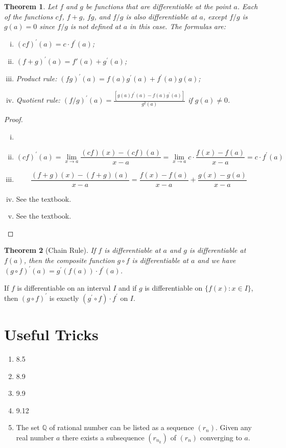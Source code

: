 \documentclass[12pt, lettersize]{book}
\newtheorem{thm}{Theorem}[section]
\begin{document}
	\begin{thm}\label{def:28.3}
		Let $f$ and $g$ be functions that are differentiable at the point $a$. Each of the functions $cf$, $f+g$, $fg$, and $f/g$ is also differentiable at $a$, except $f/g$ is $g(a)=0$ since $f/g$ is not defined at $a$ in this case.
		The formulas are:
		\begin{enumerate}[(i)]
			\item $(cf)^\prime(a)=c\cdot f^\prime(a)$;
			\item $(f+g)^\prime(a)=f\prime(a)+g^\prime(a)$;
			\item Product rule: $(fg)^\prime(a)=f(a)g^\prime(a)+f^\prime(a)g(a)$;
			\item Quotient rule: $(f/g)^\prime(a)=\frac{[g(a)f^\prime(a)-f(a)g^\prime(a)]}{g^2(a)}$ if $g(a)\neq0$.
		\end{enumerate}
	\end{thm}
	\begin{proof}
		\begin{enumerate}[(i)]
			\item[]
			\item
			\begin{displaymath}
				(cf)^\prime(a)=\lim_{x\rightarrow a}\frac{(cf)(x)-(cf)(a)}{x-a}=\lim_{x\rightarrow a}c\cdot\frac{f(x)-f(a)}{x-a}=c\cdot f^\prime(a)
			\end{displaymath} 
			\item
			\begin{displaymath}
				\frac{(f+g)(x)-(f+g)(a)}{x-a}=\frac{f(x)-f(a)}{x-a}+\frac{g(x)-g(a)}{x-a}
			\end{displaymath}
			\item See the textbook.
			\item See the textbook.
		\end{enumerate}
	\end{proof}
	
	\begin{thm}[Chain Rule]\label{def:28.4}
		If $f$ is differentiable at $a$ and $g$ is differentiable at $f(a)$, then the composite function $g\circ f$ is differentiable at $a$ and we have $(g\circ f)^\prime(a)=g^\prime(f(a))\cdot f^\prime(a)$.
	\end{thm}
	If $f$ is differentiable on an interval $I$ and if $g$ is differentiable on $\{f(x): x\in I\}$, then $(g\circ f)^\prime$ is exactly $(g^\prime\circ f)\cdot f^\prime$ on $I$.
	
	\chapter{Useful Tricks}
	\begin{enumerate}
		\item 8.5
		\item 8.9
		\item 9.9
		\item 9.12
		\item The set $\mathbb{Q}$ of rational number can be listed as a sequence $(r_n)$. Given any real number $a$ there exists a subsequence $(r_{n_k})$ of $(r_n)$ converging to $a$.
	\end{enumerate}
	
\end{document}
